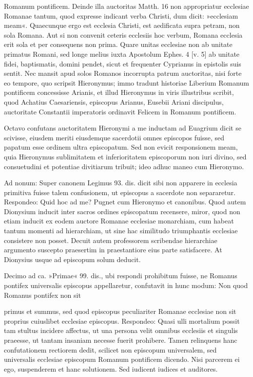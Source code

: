 Romanum pontificem. Deinde illa auctoritas Matth. 16 non appropriatur ecclesiae Romanae tantum, quod expresse indicant verba Christi, dum dicit: »ecclesiam meam«. Quaecunque ergo est ecclesia Christi, est aedificata supra petram, non sola Romana. Aut si non convenit ceteris ecclesiis hoc verbum, Romana ecclesia erit sola et per consequens non prima. Quare unitas ecclesiae non ab unitate primatus Romani, sed longe melius iuxta Apostolum Ephes. 4 [v. 5] ab unitate fidei, baptismatis, domini pendet, sicut et frequenter Cyprianus in epistolis suis sentit. Nec mansit apud solos Romanos incorrupta patrum auctoritas, nisi forte eo tempore, quo scripsit Hieronymus; immo tradunt historiae Liberium Romanum pontificem concessisse Arianis, et illud Hieronymus in viris illustribus scribit, quod Achatius Caesariensis, episcopus Arianus, Eusebii Ariani discipulus, auctoritate Constantii imperatoris ordinavit Felicem in Romanum pontificem.

Octavo confutans auctoritatem Hieronymi a me inductam ad Euagrium dicit se scivisse, eiusdem meriti eiusdemque sacerdotii omnes episcopos fuisse, sed papatum esse ordinem ultra episcopatum. Sed non evicit responsionem meam, quia Hieronymus sublimitatem et inferioritatem episcoporum non iuri divino, sed consuetudini et potentiae divitiarum tribuit; ideo adhuc maneo cum Hieronymo.

Ad nonum: Super canonem Legimus 93. dis. dicit sibi non apparere \marginpar{\small[267]} in ecclesia primitiva fuisse talem confusionem, ut episcopus a sacerdote non separaretur. Respondeo: Quid hoc ad me? Pugnet cum Hieronymo et canonibus. Quod autem Dionysium inducit inter sacros ordines episcopatum recensere, miror, quod non etiam inducit ex eodem auctore Romanae ecclesiae monarchiam, cum habeat tantum momenti ad hierarchiam, ut sine hac similitudo triumphantis ecclesiae consistere non posset. Decuit autem professorem scribendae hierarchiae argumento suscepto praesertim in praestantiore eius parte satisfacere. At Dionysius usque ad episcopum solum deducit.

Decimo ad ca. »Primae« 99. dis., ubi respondi prohibitum fuisse, ne Romanus pontifex universalis episcopus appellaretur, confutavit in hunc modum: Non quod Romanus pontifex non sit

primus et summus, sed quod episcopus peculiariter Romanae ecclesiae non sit proprius cuiuslibet ecclesiae episcopus. Respondeo: Quasi ulli mortalium possit tam stultus incidere affectus, ut una persona velit omnibus ecclesiis et singulis praeesse, ut tantam insaniam necesse fuerit prohibere. Tamen relinquens hanc confutationem rectiorem dedit, scilicet non episcopum universalem, sed universalis ecclesiae episcopum Romanum pontificem dicendo. Nisi parcerem ei ego, suspenderem et hanc solutionem. Sed iudicent iudices et auditores.

